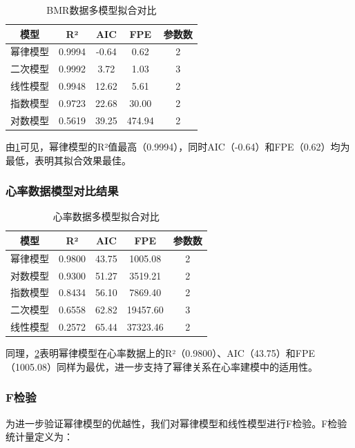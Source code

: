 \begin{table}[H]
\caption{BMR数据多模型拟合对比}
\label{tab:bmr-models}
\centering
\begin{tabular}{ccccc}
\toprule[1.5pt]
模型 & R² & AIC & FPE & 参数数 \\
\midrule[1pt]
幂律模型 & 0.9994 & -0.64 & 0.62 & 2 \\
二次模型 & 0.9992 & 3.72 & 1.03 & 3 \\
线性模型 & 0.9948 & 12.62 & 5.61 & 2 \\
指数模型 & 0.9723 & 22.68 & 30.00 & 2 \\
对数模型 & 0.5619 & 39.25 & 474.94 & 2 \\
\bottomrule[1.5pt]
\end{tabular}
\end{table}

由\cref{tab:bmr-models}可见，幂律模型的R²值最高（0.9994），同时AIC（-0.64）和FPE（0.62）均为最低，表明其拟合效果最佳。

\subsubsection{心率数据模型对比结果}

\begin{table}[H]
\caption{心率数据多模型拟合对比}
\label{tab:hr-models}
\centering
\begin{tabular}{ccccc}
\toprule[1.5pt]
模型 & R² & AIC & FPE & 参数数 \\
\midrule[1pt]
幂律模型 & 0.9800 & 43.75 & 1005.08 & 2 \\
对数模型 & 0.9300 & 51.27 & 3519.21 & 2 \\
指数模型 & 0.8434 & 56.10 & 7869.40 & 2 \\
二次模型 & 0.6558 & 62.82 & 19457.60 & 3 \\
线性模型 & 0.2572 & 65.44 & 37323.46 & 2 \\
\bottomrule[1.5pt]
\end{tabular}
\end{table}

同理，\cref{tab:hr-models}表明幂律模型在心率数据上的R²（0.9800）、AIC（43.75）和FPE（1005.08）同样为最优，进一步支持了幂律关系在心率建模中的适用性。

\subsubsection{F检验}

为进一步验证幂律模型的优越性，我们对幂律模型和线性模型进行F检验。F检验统计量定义为：

